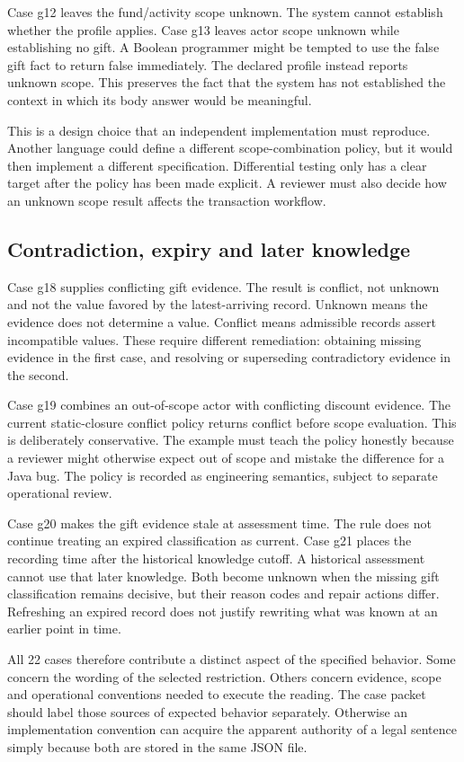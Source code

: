 \documentclass[12pt,a4paper,oneside,openany]{book}
\begin{document}
Case g12 leaves the fund/activity scope unknown. The system cannot establish
whether the profile applies. Case g13 leaves actor scope unknown while
establishing no gift. A Boolean programmer might be tempted to use the false
gift fact to return false immediately. The declared profile instead reports
unknown scope. This preserves the fact that the system has not established the
context in which its body answer would be meaningful.

This is a design choice that an independent implementation must reproduce.
Another language could define a different scope-combination policy, but it
would then implement a different specification. Differential testing only has
a clear target after the policy has been made explicit. A reviewer must also
decide how an unknown scope result affects the transaction workflow.

\subsection{Contradiction, expiry and later knowledge}
Case g18 supplies conflicting gift evidence. The result is conflict, not
unknown and not the value favored by the latest-arriving record. Unknown means
the evidence does not determine a value. Conflict means admissible records
assert incompatible values. These require different remediation: obtaining
missing evidence in the first case, and resolving or superseding contradictory
evidence in the second.

Case g19 combines an out-of-scope actor with conflicting discount evidence.
The current static-closure conflict policy returns conflict before scope
evaluation. This is deliberately conservative. The example must teach the
policy honestly because a reviewer might otherwise expect out of scope and
mistake the difference for a Java bug. The policy is recorded as engineering
semantics, subject to separate operational review.

Case g20 makes the gift evidence stale at assessment time. The rule does not
continue treating an expired classification as current. Case g21 places the
recording time after the historical knowledge cutoff. A historical assessment
cannot use that later knowledge. Both become unknown when the missing gift
classification remains decisive, but their reason codes and repair actions
differ. Refreshing an expired record does not justify rewriting what was known
at an earlier point in time.

All 22 cases therefore contribute a distinct aspect of the specified behavior.
Some concern the wording of the selected restriction. Others concern evidence,
scope and operational conventions needed to execute the reading. The case
packet should label those sources of expected behavior separately. Otherwise
an implementation convention can acquire the apparent authority of a legal
sentence simply because both are stored in the same JSON file.
\end{document}
